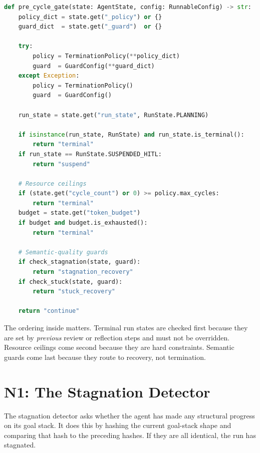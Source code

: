 \begin{lstlisting}[language=Python,
    caption={\texttt{pre\_cycle\_gate} --- Layer-1 guard routing (src/guards.py)},
    label={lst:pre-cycle-gate}]
def pre_cycle_gate(state: AgentState, config: RunnableConfig) -> str:
    policy_dict = state.get("_policy") or {}
    guard_dict  = state.get("_guard")  or {}

    try:
        policy = TerminationPolicy(**policy_dict)
        guard  = GuardConfig(**guard_dict)
    except Exception:
        policy = TerminationPolicy()
        guard  = GuardConfig()

    run_state = state.get("run_state", RunState.PLANNING)

    if isinstance(run_state, RunState) and run_state.is_terminal():
        return "terminal"
    if run_state == RunState.SUSPENDED_HITL:
        return "suspend"

    # Resource ceilings
    if (state.get("cycle_count") or 0) >= policy.max_cycles:
        return "terminal"
    budget = state.get("token_budget")
    if budget and budget.is_exhausted():
        return "terminal"

    # Semantic-quality guards
    if check_stagnation(state, guard):
        return "stagnation_recovery"
    if check_stuck(state, guard):
        return "stuck_recovery"

    return "continue"
\end{lstlisting}

The ordering inside  matters.  Terminal run states
are checked first because they are set by \emph{previous} review or
reflection steps and must not be overridden.  Resource ceilings come second
because they are hard constraints.  Semantic guards come last because they
route to recovery, not termination.

\section{N1: The Stagnation Detector}
\label{sec:stagnation}

The stagnation detector asks whether the agent has made any structural
progress on its goal stack.  It does this by hashing the current goal-stack
shape and comparing that hash to the preceding 
hashes.  If they are all identical, the run has stagnated.

